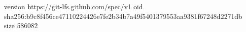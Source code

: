 version https://git-lfs.github.com/spec/v1
oid sha256:b9c8f456ce47110224426e7fe2b34b7a49f5401379553aa9381f67248d2271db
size 586082
